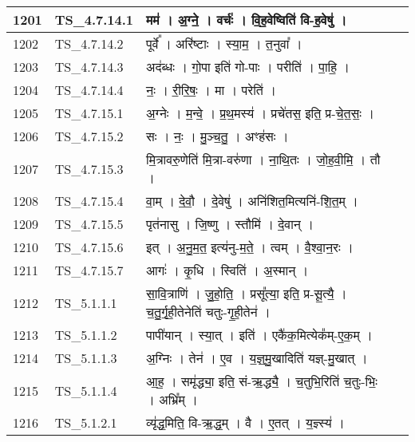 \documentclass[17pt]{extarticle}
\begin{document}
\begin{longtable}{||p{0.4in}||p{0.9in}||p{4.0in}||p{0.9in}||}
        \hline
            1201 & TS\_4.7.14.1 & मम॑   ।   अ॒ग्ने॒   ।   वर्चः॑   ।   वि॒ह॒वेष्विति॑ वि{-}ह॒वेषु॑   ।    &      \\
        \hline
            1202 & TS\_4.7.14.2 & पूर्वे᳚   ।   अरि॑ष्टाः   ।   स्या॒म॒   ।   त॒नुवा᳚   ।    &      \\
        \hline
            1203 & TS\_4.7.14.3 & अद॑ब्धः   ।   गो॒पा इति॑ गो{-}पाः   ।   परीति॑   ।   पा॒हि॒   ।    &      \\
        \hline
            1204 & TS\_4.7.14.4 & नः॒   ।   री॒रि॒षः॒   ।   मा   ।   परेति॑   ।    &      \\
        \hline
            1205 & TS\_4.7.15.1 & अ॒ग्नेः   ।   म॒न्वे॒   ।   प्र॒थ॒मस्य॑   ।   प्रचे॑तस॒ इति॒ प्र{-}चे॒त॒सः॒   ।    &      \\
        \hline
            1206 & TS\_4.7.15.2 & सः   ।   नः॒   ।   मु॒ञ्च॒तु॒   ।   अꣳह॑सः   ।    &      \\
        \hline
            1207 & TS\_4.7.15.3 & मि॒त्रावरु॒णेति॑ मि॒त्रा{-}वरु॑णा   ।   ना॒थि॒तः   ।   जो॒ह॒वी॒मि॒   ।   तौ   ।    &      \\
        \hline
            1208 & TS\_4.7.15.4 & वा॒म्   ।   दे॒वौ॒   ।   दे॒वेषु॑   ।   अनि॑शित॒मित्यनि॑{-}शि॒त॒म्   ।    &      \\
        \hline
            1209 & TS\_4.7.15.5 & पृत॑नासु   ।   जि॒ष्णु   ।   स्तौमि॑   ।   दे॒वान्   ।    &      \\
        \hline
            1210 & TS\_4.7.15.6 & इत्   ।   अ॒नु॒म॒त॒ इत्य॑नु{-}म॒ते॒   ।   त्वम्   ।   वै॒श्वा॒न॒रः   ।    &      \\
        \hline
            1211 & TS\_4.7.15.7 & आगः॑   ।   कृ॒धि   ।   स्विति॑   ।   अ॒स्मान्   ।    &      \\
        \hline
            1212 & TS\_5.1.1.1 & सा॒वि॒त्राणि॑   ।   जु॒हो॒ति॒   ।   प्रसू᳚त्या॒ इति॒ प्र{-}सू॒त्यै॒   ।   च॒तु॒र्गृ॒ही॒तेनेति॑ चतुः{-}गृ॒ही॒तेन॑   ।    &      \\
        \hline
            1213 & TS\_5.1.1.2 & पापी॑यान्   ।   स्या॒त्   ।   इति॑   ।   एकै॑क॒मित्येक᳚म्{-}ए॒क॒म्   ।    &      \\
        \hline
            1214 & TS\_5.1.1.3 & अ॒ग्निः   ।   तेन॑   ।   ए॒व   ।   य॒ज्ञ्॒मु॒खादिति॑ यज्ञ्{-}मु॒खात्   ।    &      \\
        \hline
            1215 & TS\_5.1.1.4 & आ॒ह॒   ।   समृ॑द्ध्या॒ इति॒ सं{-}ऋ॒द्ध्यै॒   ।   च॒तुभि॒रिति॑ च॒तुः{-}भिः॒   ।   अभ्रि᳚म्   ।    &      \\
        \hline
            1216 & TS\_5.1.2.1 & व्यृ॑द्ध॒मिति॒ वि{-}ऋ॒द्ध॒म्   ।   वै   ।   ए॒तत्   ।   य॒ज्ञ्स्य॑   ।    &      \\

\end{longtable}
\end{document}
